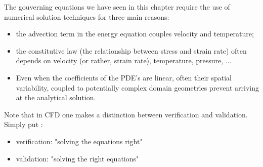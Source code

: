 

The gouverning equations we have seen in this chapter require the use 
of numerical solution techniques for three main reasons:
\begin{itemize}
\item the advection term in the energy equation couples velocity and temperature;
\item the constitutive law (the relationship between stress and strain rate) 
often depends on velocity (or rather, strain rate), temperature, pressure, ...
\item Even when the coefficients of the PDE's are linear, often their spatial
variability, coupled to potentially complex domain geometries prevent 
arriving at the analytical solution.
\end{itemize}

Note that in CFD one makes a distinction between verification and validation. 
Simply put \cite{roac97}:
\begin{itemize}
\item verification: "solving the equations right"
\item validation: "solving the right equations"
\end{itemize}


